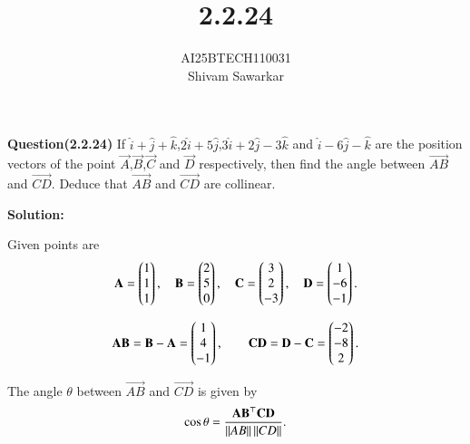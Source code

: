 \documentclass[journal]{IEEEtran}
\begin{document}

\vspace{3cm}

\title{2.2.24}
\author{AI25BTECH110031 \\ Shivam Sawarkar}
 \maketitle
{\let\newpage\relax\maketitle}

\renewcommand{\thefigure}{\theenumi}
\renewcommand{\thetable}{\theenumi}
\setlength{\intextsep}{10pt} %


\renewcommand{\thetable}{\theenumi}

\textbf{Question(2.2.24)}
If $\hat{i}+\hat{j}+\hat{k}$,$2\hat{i}+5\hat{j}$,$3\hat{i}+2\hat{j}-3\hat{k}$ and $\hat{i}-6\hat{j}-\hat{k}$ are the position vectors of the point $\Vec{A}$,$\Vec{B}$,$\Vec{C}$ and $\Vec{D}$ respectively, then find the angle between $\Vec{AB}$ and $\Vec{CD}$. Deduce that $\Vec{AB}$ and $\Vec{CD}$ are collinear.

\textbf{Solution:}

Given points are
\begin{align}
\mathbf{A}=\begin{pmatrix}1\\1\\1\end{pmatrix}, \quad
\mathbf{B}=\begin{pmatrix}2\\5\\0\end{pmatrix}, \quad
\mathbf{C}=\begin{pmatrix}3\\2\\-3\end{pmatrix}, \quad
\mathbf{D}=\begin{pmatrix}1\\-6\\-1\end{pmatrix}.
\end{align}

\begin{align}
\mathbf{AB} = \mathbf{B}-\mathbf{A} = \begin{pmatrix}1\\4\\-1\end{pmatrix}, 
\qquad
\mathbf{CD} = \mathbf{D}-\mathbf{C} = \begin{pmatrix}-2\\-8\\2\end{pmatrix}.
\end{align}


The angle $\theta$ between $\vec{AB}$ and $\vec{CD}$ is given by
\begin{align}
\cos\theta = \frac{\mathbf{AB}^{\top}\mathbf{CD}}{\left\lVert AB\right\rVert\left\lVert CD\right\rVert}.
\end{align}
\end{document}
